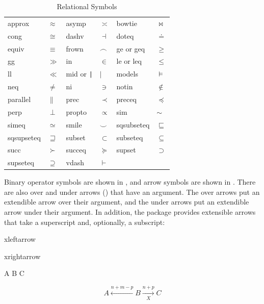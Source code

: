 \begin{table}[hbtp]
\caption{Relational Symbols}
\label{tab:relsym}
\centering
\begin{tabular}{llllll}
\gls{approx} & $\approx$ &
\gls{asymp} & $\asymp$ &
\gls{bowtie} & $\bowtie$ \\
\gls{cong} & $\cong$ &
\gls{dashv} & $\dashv$ &
\gls{doteq} & $\doteq$ \\
\gls{equiv} & $\equiv$ &
\gls{frown} & $\frown$ &
\gls{ge} or \gls{geq} & $\geq$ \\
\gls{gg} & $\gg$ &
\gls{in} & $\in$ &
\gls{le} or \gls{leq} & $\leq$ \\
\gls{ll} & $\ll$ &
\gls{mid} or \verb"|" & $\mid$ &
\gls{models} & $\models$ \\ 
\gls{neq} & $\neq$ &
\gls{ni} & $\ni$ &
\gls{notin} & $\notin$ \\
\gls{parallel} & $\parallel$ &
\gls{prec}& $\prec$ &
\gls{preceq}& $\preceq$ \\
\gls{perp} & $\perp$ &
\gls{propto} & $\propto$ &
\gls{sim} & $\sim$ \\
\gls{simeq} & $\simeq$ &
\gls{smile} & $\smile$ &
\gls{sqsubseteq} & $\sqsubseteq$ \\
\gls{sqsupseteq} & $\sqsupseteq$ &
\gls{subset} & $\subset$ &
\gls{subseteq} & $\subseteq$ \\
\gls{succ} & $\succ$ &
\gls{succeq} & $\succeq$ &
\gls{supset} & $\supset$ \\
\gls{supseteq} & $\supseteq$ &
\gls{vdash} & $\vdash$ &
\end{tabular}
\end{table}

Binary operator symbols are shown in , and arrow
symbols are shown in . There are also over and
under arrows () that have an argument.
The over arrows put an extendible arrow over their argument, and the
under arrows put an extendible arrow under their argument. In
addition, the  package provides extensible arrows that
take a superscript and, optionally, a subscript:
\begin{definition}
\gls{xleftarrow}
\end{definition}
\begin{definition}
\gls{xrightarrow}
\end{definition}

\begin{code}
\newline
\mbox{}\qquad  A  B  
  C\newline
{}
\end{code}
\begin{result}
\[
  A \xleftarrow{n+m-p} B \xrightarrow[X]{n+p} C
\]
\end{result}

